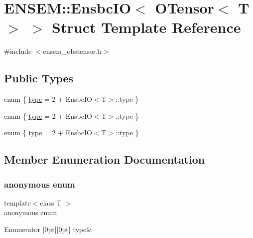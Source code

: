 \hypertarget{structENSEM_1_1EnsbcIO_3_01OTensor_3_01T_01_4_01_4}{}\section{E\+N\+S\+EM\+:\+:Ensbc\+IO$<$ O\+Tensor$<$ T $>$ $>$ Struct Template Reference}
\label{structENSEM_1_1EnsbcIO_3_01OTensor_3_01T_01_4_01_4}


{\ttfamily \#include $<$ensem\+\_\+obstensor.\+h$>$}

\subsection*{Public Types}
\begin{DoxyCompactItemize}
\item 
enum \{ \mbox{\hyperlink{structENSEM_1_1EnsbcIO_3_01OTensor_3_01T_01_4_01_4_a22aa8f56926e7c10361d1eddd182fd62a64eda6fb88be434d1c8331318f02a60e}{type}} = 2 + Ensbc\+IO$<$T$>$\+:\+:type
 \}
\item 
enum \{ \mbox{\hyperlink{structENSEM_1_1EnsbcIO_3_01OTensor_3_01T_01_4_01_4_a22aa8f56926e7c10361d1eddd182fd62a64eda6fb88be434d1c8331318f02a60e}{type}} = 2 + Ensbc\+IO$<$T$>$\+:\+:type
 \}
\item 
enum \{ \mbox{\hyperlink{structENSEM_1_1EnsbcIO_3_01OTensor_3_01T_01_4_01_4_a22aa8f56926e7c10361d1eddd182fd62a64eda6fb88be434d1c8331318f02a60e}{type}} = 2 + Ensbc\+IO$<$T$>$\+:\+:type
 \}
\end{DoxyCompactItemize}


\subsection{Member Enumeration Documentation}
\mbox{\label{structENSEM_1_1EnsbcIO_3_01OTensor_3_01T_01_4_01_4_af6d3d53de920c661d6c778736fdb1a46}} 
\subsubsection{\texorpdfstring{anonymous enum}{anonymous enum}}
{\footnotesize\ttfamily template$<$class T $>$ \\
anonymous enum}

\begin{DoxyEnumFields}{Enumerator}
[0pt][0pt]{}\mbox{\label{structENSEM_1_1EnsbcIO_3_01OTensor_3_01T_01_4_01_4_a22aa8f56926e7c10361d1eddd182fd62a64eda6fb88be434d1c8331318f02a60e}} 
type&\\
\hline

\end{DoxyEnumFields}
\mbox{\label{structENSEM_1_1EnsbcIO_3_01OTensor_3_01T_01_4_01_4_a5188f985e6c12d0da6329463adc65864}} 
